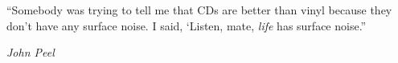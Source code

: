 \begin{epigrafe}
“Somebody was trying to tell me that CDs are better than vinyl because they don’t have any surface noise. 
I said, ‘Listen, mate, \textit{life} has surface noise.”

{\textit{John Peel}}
\end{epigrafe}

